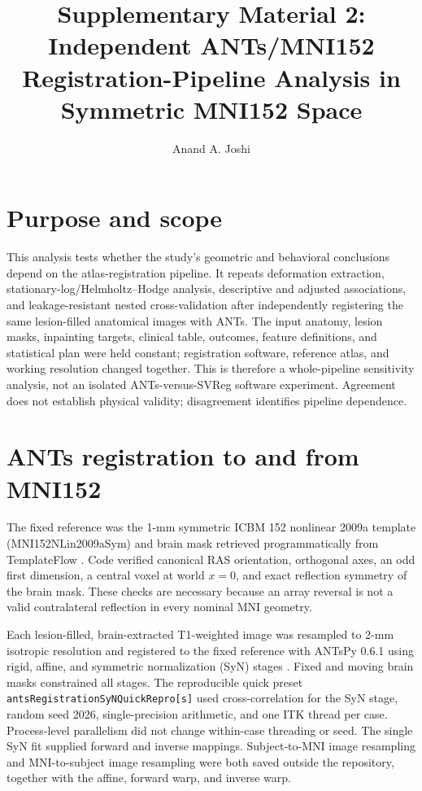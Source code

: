 \documentclass[11pt]{article}
\title{Supplementary Material 2: Independent ANTs/MNI152 Registration-Pipeline Analysis in
Symmetric MNI152 Space}
\author{Anand A. Joshi}
\date{}
\begin{document}
\maketitle

\section{Purpose and scope}

This analysis tests whether the study's geometric and behavioral conclusions
depend on the atlas-registration pipeline. It repeats deformation
extraction, stationary-log/Helmholtz--Hodge analysis, descriptive and adjusted
associations, and leakage-resistant nested cross-validation after independently
registering the same lesion-filled anatomical images with ANTs. The input
anatomy, lesion masks, inpainting targets, clinical table, outcomes, feature
definitions, and statistical plan were held constant; registration software,
reference atlas, and working resolution changed together. This is therefore a
whole-pipeline sensitivity analysis, not an isolated ANTs-versus-SVReg software
experiment. Agreement does not establish physical validity; disagreement
identifies pipeline dependence.

\section{ANTs registration to and from MNI152}

The fixed reference was the 1-mm symmetric ICBM 152 nonlinear 2009a template
(MNI152NLin2009aSym) and brain mask retrieved programmatically from TemplateFlow
\citep{Fonov2009,Ciric2022}. Code verified canonical RAS orientation,
orthogonal axes, an odd first dimension, a central voxel at world $x=0$, and
exact reflection symmetry of the brain mask. These checks are necessary because
an array reversal is not a valid contralateral reflection in every nominal MNI
geometry.

Each lesion-filled, brain-extracted T1-weighted image was resampled to 2-mm
isotropic resolution and registered to the fixed reference with ANTsPy 0.6.1
using rigid, affine, and symmetric normalization (SyN) stages
\citep{Avants2008,Avants2011}. Fixed and moving brain masks constrained all
stages. The reproducible quick preset
\texttt{antsRegistrationSyNQuickRepro[s]} used cross-correlation for the SyN
stage, random seed 2026, single-precision arithmetic, and one ITK thread per
case. Process-level parallelism did not change within-case threading or seed.
The single SyN fit supplied forward and inverse mappings. Subject-to-MNI image
resampling and MNI-to-subject image resampling were both saved outside the
repository, together with the affine, forward warp, and inverse warp.
\end{document}
